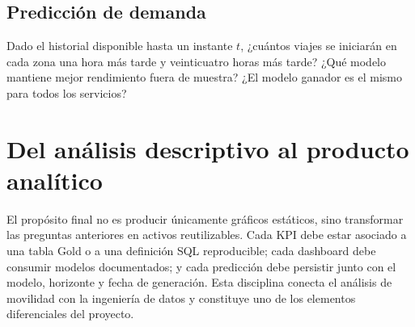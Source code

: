 \subsection{Predicción de demanda}

Dado el historial disponible hasta un instante \(t\), ¿cuántos viajes se iniciarán en cada zona una hora más tarde y veinticuatro horas más tarde? ¿Qué modelo mantiene mejor rendimiento fuera de muestra? ¿El modelo ganador es el mismo para todos los servicios?

\section{Del análisis descriptivo al producto analítico}

El propósito final no es producir únicamente gráficos estáticos, sino transformar las preguntas anteriores en activos reutilizables. Cada KPI debe estar asociado a una tabla Gold o a una definición SQL reproducible; cada dashboard debe consumir modelos documentados; y cada predicción debe persistir junto con el modelo, horizonte y fecha de generación. Esta disciplina conecta el análisis de movilidad con la ingeniería de datos y constituye uno de los elementos diferenciales del proyecto.
